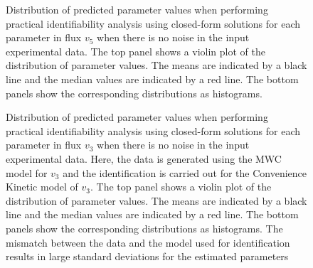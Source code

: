 \documentclass[10pt]{article}
\begin{document}
\begin{figure}[!tbhp]
	\caption{Distribution of predicted parameter values when performing practical identifiability analysis using closed-form solutions for each parameter in flux $v_5$ when there is no noise in the input experimental data. The top panel shows a violin plot of the distribution of parameter values. The means are indicated by a black line and the median values are indicated by a red line. The bottom panels show the corresponding distributions as histograms.}\label{fig:v5_ck_values}
\end{figure}

\begin{figure}[!tbhp]
	\caption{Distribution of predicted parameter values when performing practical identifiability analysis using closed-form solutions for each parameter in flux $v_3$ when there is no noise in the input experimental data. Here, the data is generated using the MWC model for $v_3$ and the identification is carried out for the Convenience Kinetic model of $v_3$. The top panel shows a violin plot of the distribution of parameter values. The means are indicated by a black line and the median values are indicated by a red line. The bottom panels show the corresponding distributions as histograms. The mismatch between the data and the model used for identification results in large standard deviations for the estimated parameters}\label{fig:v3_mwc_ck_values}
\end{figure}
\end{document}
